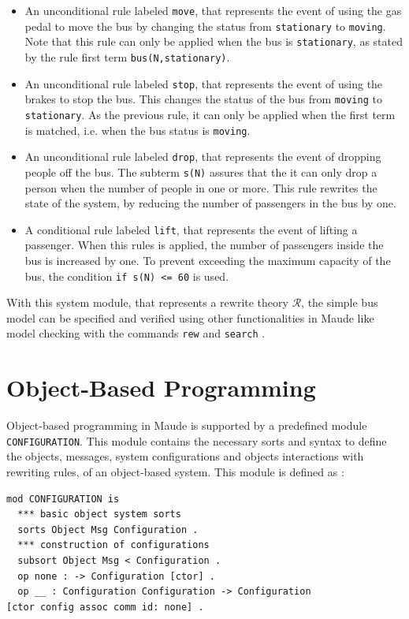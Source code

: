 \begin{itemize}
    \item An unconditional rule labeled \texttt{move}, that represents the event of using the gas pedal to move the bus by changing the status from \texttt{stationary} to \texttt{moving}. Note that this rule can only be applied when the bus is \texttt{stationary}, as stated by the rule first term \texttt{bus(N,stationary)}.
    \item An unconditional rule labeled \texttt{stop}, that represents the event of using the brakes to stop the bus. This changes the status of the bus from \texttt{moving} to \texttt{stationary}. As the previous rule, it can only be applied when the first term is matched, i.e. when the bus status is \texttt{moving}. 
    \item An unconditional rule labeled \texttt{drop}, that represents the event of dropping people off the bus. The subterm \texttt{s(N)} assures that the it can only drop a person when the number of people in one or more. This rule rewrites the state of the system, by reducing the number of passengers in the bus by one.
    \item A conditional rule labeled \texttt{lift}, that represents the event of lifting a passenger. When this rules is applied, the number of passengers inside the bus is increased by one. To prevent exceeding the maximum capacity of the bus, the condition \texttt{if s(N) <= 60} is used. 
\end{itemize}
With this system module, that represents a rewrite theory $\mathscr{R}$, the simple bus model can be specified and verified using other functionalities in Maude like model checking with the commands \texttt{rew} and \texttt{search} \cite{MaudeManual}.


\section{Object-Based Programming}
Object-based programming in Maude \cite{MaudeManual, Lecture3, PeterMaude} is supported by a predefined module \texttt{CONFIGURATION}. This module contains the necessary sorts and syntax to define the objects, messages, system configurations and objects interactions with rewriting rules, of an object-based system. This module is defined as :
\begin{lstlisting}
mod CONFIGURATION is
  *** basic object system sorts
  sorts Object Msg Configuration .
  *** construction of configurations
  subsort Object Msg < Configuration .
  op none : -> Configuration [ctor] .
  op __ : Configuration Configuration -> Configuration
[ctor config assoc comm id: none] .
\end{lstlisting}

